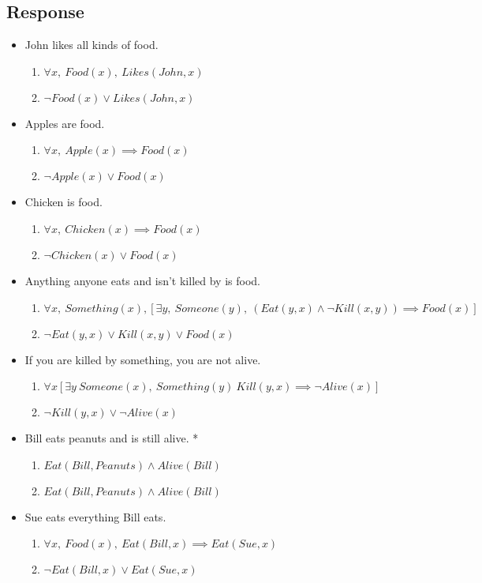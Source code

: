 \documentclass[13pt]{article}
\begin{document}
\subsection*{Response}
\begin{itemize}
\item John likes all kinds of food.
  \begin{enumerate}[label=(\alph*)]
  \item $\forall x, \ Food(x), \ Likes(John, x)$
  \item $\neg Food(x) \lor Likes(John, x)$
  \end{enumerate}
\item Apples are food.
  \begin{enumerate}[label=(\alph*)]
  \item $\forall x, \ Apple(x) \implies Food(x)$
  \item $\neg Apple(x) \lor Food(x)$
  \end{enumerate}
\item Chicken is food.
  \begin{enumerate}[label=(\alph*)]
  \item $\forall x, \ Chicken(x) \implies Food(x)$
  \item $\neg Chicken(x) \lor Food(x)$
  \end{enumerate}
\item Anything anyone eats and isn’t killed by is food.
  \begin{enumerate}[label=(\alph*)]
  \item $\forall x, \ Something(x), [\exists y, \ Someone(y), \ (Eat(y, x) \land \neg Kill(x, y)) \implies Food(x)]$
  \item $\neg Eat(y, x) \lor Kill(x, y) \lor Food(x)$
  \end{enumerate}
\item If you are killed by something, you are not alive.
  \begin{enumerate}[label=(\alph*)]
  \item $\forall x [\exists y \ Someone(x), \ Something(y) \ Kill(y, x) \implies \neg Alive(x)]$
  \item $\neg Kill(y, x) \lor \neg Alive(x)$
  \end{enumerate}
\item Bill eats peanuts and is still alive. *
  \begin{enumerate}[label=(\alph*)]
  \item $Eat(Bill, Peanuts) \land Alive(Bill)$
  \item $Eat(Bill, Peanuts) \land Alive(Bill)$
  \end{enumerate}
\item Sue eats everything Bill eats.
  \begin{enumerate}[label=(\alph*)]
  \item $\forall x, \ Food(x), \ Eat(Bill, x) \implies Eat(Sue, x)$
  \item $\neg Eat(Bill, x) \lor Eat(Sue, x)$
  \end{enumerate}
\end{itemize}
\end{document}
